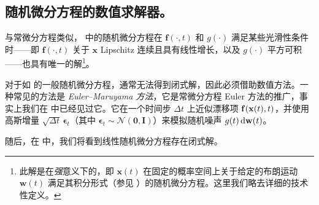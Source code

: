 \subsection{随机微分方程的数值求解器。} 与常微分方程类似， 中的随机微分方程在 $\mathbf{f}(\cdot, t)$ 和 $g(\cdot)$ 满足某些光滑性条件时——即 $\mathbf{f}(\cdot, t)$ 关于 $\mathbf{x}$ Lipschitz 连续且具有线性增长，以及 $g(\cdot)$ 平方可积——也具有唯一的解\footnote{此解是在\emph{强}意义下的，即 $\mathbf{x}(t)$ 在固定的概率空间上关于给定的布朗运动 $\mathbf{w}(t)$ 满足其积分形式（参见 ）的随机微分方程。这里我们略去详细的技术性定义。}。


对于如  的一般随机微分方程，通常无法得到闭式解，因此必须借助数值方法。一种常见的方法是 \emph{Euler–Maruyama 方法}，它是常微分方程 Euler 方法的推广，事实上我们在  中已经见过它。它在一个时间步 $\Delta t$ 上近似漂移项 ${\mathbf{f}}({\mathbf{x}}(t), t)$，并使用高斯增量 $\sqrt{\Delta t} \, \boldsymbol{\epsilon}_t$（其中 $\boldsymbol{\epsilon}_t \sim \mathcal{N}(\mathbf{0}, \mathbf{I})$）来模拟随机噪声 $g(t) \mathop{}\!\mathrm{d} {\mathbf{w}}(t)$。

随后，在  中，我们将看到线性随机微分方程存在闭式解。


